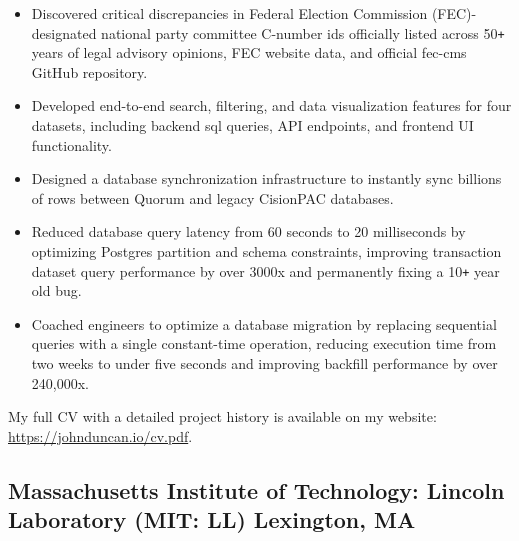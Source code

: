 \documentclass[]{article}
\def\Plus{\texttt{+}}
\begin{document}
\begin{itemize}
    \item Discovered critical discrepancies in Federal Election Commission (FEC)-designated national party committee C-number ids officially listed across 50{\Plus} years of legal advisory opinions, FEC website data, and official fec-cms GitHub repository.
    \item Developed end-to-end search, filtering, and data visualization features for four datasets, including backend sql queries, API endpoints, and frontend UI functionality.
    \item Designed a database synchronization infrastructure to instantly sync billions of rows between Quorum and legacy CisionPAC databases.
    \item Reduced database query latency from 60 seconds to 20 milliseconds by optimizing Postgres partition and schema constraints, improving transaction dataset query performance by over 3000x and permanently fixing a 10{\Plus} year old bug.
    \item Coached engineers to optimize a database migration by replacing sequential queries with a single constant-time operation, reducing execution time from two weeks to under five seconds and improving backfill performance by over 240,000x.
\end{itemize}

My full CV with a detailed project history is available on my website: \href{https://johnduncan.io/cv.pdf}{https://johnduncan.io/cv.pdf}.

\subsection*{Massachusetts Institute of Technology: Lincoln Laboratory (MIT: LL) \hfill \textnormal{Lexington, MA}}
\end{document}
